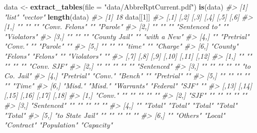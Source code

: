 \documentclass[
  12pt,
]{book}
\newenvironment{Shaded}{\begin{snugshade}}{\end{snugshade}}
\newcommand{\CommentTok}[1]{\textcolor[rgb]{0.37,0.37,0.37}{\textit{#1}}}
\newcommand{\DataTypeTok}[1]{\textcolor[rgb]{0.27,0.27,0.27}{#1}}
\newcommand{\DecValTok}[1]{\textcolor[rgb]{0.06,0.06,0.06}{#1}}
\newcommand{\KeywordTok}[1]{\textcolor[rgb]{0.27,0.27,0.27}{\textbf{#1}}}
\newcommand{\NormalTok}[1]{#1}
\newcommand{\StringTok}[1]{\textcolor[rgb]{0.5,0.5,0.5}{#1}}
\begin{document}
\begin{Shaded}
\begin{Highlighting}[]
\NormalTok{data \textless{}{-}}\StringTok{ }\KeywordTok{extract\_tables}\NormalTok{(}\DataTypeTok{file =} \StringTok{"data/AbbreRptCurrent.pdf"}\NormalTok{)}
\KeywordTok{is}\NormalTok{(data)}
\CommentTok{\#\textgreater{} [1] "list"   "vector"}
\KeywordTok{length}\NormalTok{(data)}
\CommentTok{\#\textgreater{} [1] 18}
\NormalTok{data[[}\DecValTok{1}\NormalTok{]]}
\CommentTok{\#\textgreater{}      [,1]     [,2]       [,3]     [,4]           [,5]        [,6]        }
\CommentTok{\#\textgreater{} [1,] ""       ""         ""       "Conv. Felons" ""          "Parole"    }
\CommentTok{\#\textgreater{} [2,] ""       ""         ""       "Sentenced to" ""          "Violators" }
\CommentTok{\#\textgreater{} [3,] ""       ""         ""       "County Jail"  ""          "with a New"}
\CommentTok{\#\textgreater{} [4,] ""       "Pretrial" "Conv."  ""             "Parole"    ""          }
\CommentTok{\#\textgreater{} [5,] ""       ""         ""       "time"         ""          "Charge"    }
\CommentTok{\#\textgreater{} [6,] "County" "Felons"   "Felons" ""             "Violators" ""          }
\CommentTok{\#\textgreater{}      [,7]       [,8]    [,9]       [,10]     [,11]      [,12]        }
\CommentTok{\#\textgreater{} [1,] ""         ""      ""         ""        ""         "Conv. SJF"  }
\CommentTok{\#\textgreater{} [2,] ""         ""      ""         ""        ""         "Sentenced"  }
\CommentTok{\#\textgreater{} [3,] ""         ""      ""         ""        ""         "to Co. Jail"}
\CommentTok{\#\textgreater{} [4,] "Pretrial" "Conv." "Bench"    ""        "Pretrial" ""           }
\CommentTok{\#\textgreater{} [5,] ""         ""      ""         ""        ""         "Time"       }
\CommentTok{\#\textgreater{} [6,] "Misd."    "Misd." "Warrants" "Federal" "SJF"      ""           }
\CommentTok{\#\textgreater{}      [,13]           [,14]    [,15]   [,16]      [,17]        [,18]     }
\CommentTok{\#\textgreater{} [1,] "Conv."         ""       ""      ""         ""           ""        }
\CommentTok{\#\textgreater{} [2,] "SJF"           ""       ""      ""         ""           ""        }
\CommentTok{\#\textgreater{} [3,] "Sentenced"     ""       ""      ""         ""           ""        }
\CommentTok{\#\textgreater{} [4,] ""              "Total"  "Total" "Total"    "Total"      "Total"   }
\CommentTok{\#\textgreater{} [5,] "to State Jail" ""       ""      ""         ""           ""        }
\CommentTok{\#\textgreater{} [6,] ""              "Others" "Local" "Contract" "Population" "Capacity"}

\end{Highlighting}
\end{Shaded}
\end{document}
